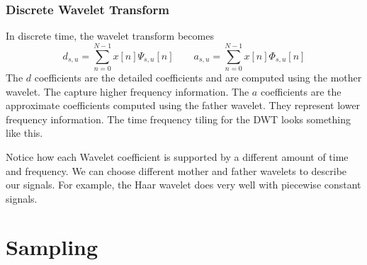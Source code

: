 \documentclass{article}
\begin{document}
\subsubsection{Discrete Wavelet Transform}
In discrete time, the wavelet transform becomes
$$d_{s,u}=\sum_{n=0}^{N-1}x[n]\Psi_{s,u}[n] \qquad a_{s,u}=\sum_{n=0}^{N-1}x[n]\Phi_{s,u}[n]$$
The $d$ coefficients are the detailed coefficients and are computed using the mother wavelet. The capture higher frequency information.
The $a$ coefficients are the approximate coefficients computed using the father wavelet. They represent lower frequency information.
The time frequency tiling for the DWT looks something like this.
\begin{figure}[H]
  \centering
\end{figure}
Notice how each Wavelet coefficient is supported by a different amount of time and frequency.
We can choose different mother and father wavelets to describe our signals. For example, the Haar wavelet
does very well with piecewise constant signals.
\section{Sampling}
\end{document}
